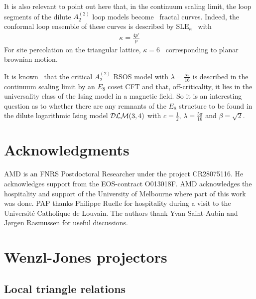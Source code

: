 \documentclass[11pt]{article}
\numberwithin{equation}{section}
\theoremstyle{plain}
\numberwithin{equation}{section}
\begin{document}
It is also relevant to point out here that, in the continuum scaling limit, the loop segments of the dilute $A_2^{(2)}$ loop models become~\cite{SAPR2012} fractal curves. Indeed, the conformal loop ensemble of these curves is described by $\mbox{SLE}_{\kappa}$~\cite{Schramm2000} with
\begin{eqnarray}
\kappa=\frac{4p'}{p}
\end{eqnarray}
For site percolation on the triangular lattice, $\kappa=6$~\cite{Smirnov2001,SLE} corresponding to planar brownian motion.

It is known~\cite{Zam1989,FZ1990,WNS1992,WPSN1994,BNW94,Suzuki1998} that the critical $A_2^{(2)}$ RSOS model with $\lambda=\frac{5\pi}{16}$ is described in the continuum scaling limit by an $E_8$ coset CFT and that, off-criticality, it lies in the universality class of the Ising model in a magnetic field.
So it is an interesting question as to whether there are any remnants of the $E_8$ structure to be found in the dilute logarithmic Ising model ${\cal DLM}(3,4)$ with $c=\frac12$, $\lambda=\frac{5\pi}{16}$ and $\beta=\sqrt{2}$.



\goodbreak
\section*{Acknowledgments} 

AMD is an FNRS Postdoctoral Researcher under the project CR28075116. He acknowledges support from the EOS-contract O013018F.
AMD acknowledges the hospitality and support of the University of Melbourne where part of this work was done. PAP thanks Philippe Ruelle for hospitality during a visit to the Universit\'e Catholique de Louvain. The authors thank Yvan Saint-Aubin and J\o rgen Rasmussen for useful discussions. 


\goodbreak
\appendix


\section{Wenzl-Jones projectors}\label{sec:partial.WJ}

\subsection{Local triangle relations}\label{sec:more.triangles}
\end{document}
